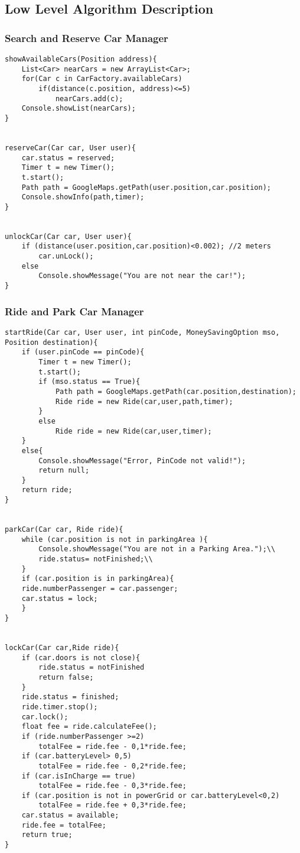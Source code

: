 \subsection{Low Level Algorithm Description}
\subsubsection{Search and Reserve Car Manager}

\begin{lstlisting}
showAvailableCars(Position address){
	List<Car> nearCars = new ArrayList<Car>;
	for(Car c in CarFactory.availableCars)
		if(distance(c.position, address)<=5)
			nearCars.add(c);
	Console.showList(nearCars);
}


reserveCar(Car car, User user){
	car.status = reserved;
	Timer t = new Timer();
	t.start();
	Path path = GoogleMaps.getPath(user.position,car.position);
	Console.showInfo(path,timer);
}


unlockCar(Car car, User user){
	if (distance(user.position,car.position)<0.002); //2 meters
		car.unLock();
	else
		Console.showMessage("You are not near the car!");
}
\end{lstlisting}


\subsubsection{Ride and Park Car Manager}
\begin{lstlisting}
startRide(Car car, User user, int pinCode, MoneySavingOption mso, Position destination){
	if (user.pinCode == pinCode){
		Timer t = new Timer();
		t.start();
		if (mso.status == True){
			Path path = GoogleMaps.getPath(car.position,destination);
			Ride ride = new Ride(car,user,path,timer);
		}
		else
			Ride ride = new Ride(car,user,timer);
	}
	else{
		Console.showMessage("Error, PinCode not valid!");
		return null;
	}
	return ride;
}


parkCar(Car car, Ride ride){
	while (car.position is not in parkingArea ){ 
		Console.showMessage("You are not in a Parking Area.");\\
		ride.status= notFinished;\\
	}
	if (car.position is in parkingArea){
	ride.numberPassenger = car.passenger;
	car.status = lock;
	}
}

 
lockCar(Car car,Ride ride){
	if (car.doors is not close){
		ride.status = notFinished
		return false;
	}
	ride.status = finished;
	ride.timer.stop();
	car.lock();
	float fee = ride.calculateFee();
	if (ride.numberPassenger >=2)
		totalFee = ride.fee - 0,1*ride.fee;
	if (car.batteryLevel> 0,5)
		totalFee = ride.fee - 0,2*ride.fee;
	if (car.isInCharge == true)
		totalFee = ride.fee - 0,3*ride.fee;
	if (car.position is not in powerGrid or car.batteryLevel<0,2)
		totalFee = ride.fee + 0,3*ride.fee;
	car.status = available;
	ride.fee = totalFee;
	return true;
}

\end{lstlisting}





